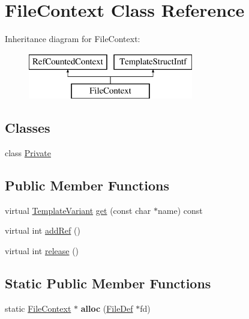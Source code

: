 \hypertarget{class_file_context}{}\section{File\+Context Class Reference}
\label{class_file_context}
Inheritance diagram for File\+Context\+:\begin{figure}[H]
\begin{center}
\leavevmode
\includegraphics[height=2.000000cm]{class_file_context}
\end{center}
\end{figure}
\subsection*{Classes}
\begin{DoxyCompactItemize}
\item 
class \mbox{\hyperlink{class_file_context_1_1_private}{Private}}
\end{DoxyCompactItemize}
\subsection*{Public Member Functions}
\begin{DoxyCompactItemize}
\item 
virtual \mbox{\hyperlink{class_template_variant}{Template\+Variant}} \mbox{\hyperlink{class_file_context_a75e1e5c1d07c7d5b19e798fae742395e}{get}} (const char $\ast$name) const
\item 
virtual int \mbox{\hyperlink{class_file_context_a4de39e9e60907cd5d245997c45e7f29f}{add\+Ref}} ()
\item 
virtual int \mbox{\hyperlink{class_file_context_a76d76875d88990fae2a58b92e4fd97e0}{release}} ()
\end{DoxyCompactItemize}
\subsection*{Static Public Member Functions}
\begin{DoxyCompactItemize}
\item 
\mbox{\label{class_file_context_a71455132aa23fd511eab661fa29255ce}} 
static \mbox{\hyperlink{class_file_context}{File\+Context}} $\ast$ {\bfseries alloc} (\mbox{\hyperlink{class_file_def}{File\+Def}} $\ast$fd)
\end{DoxyCompactItemize}


